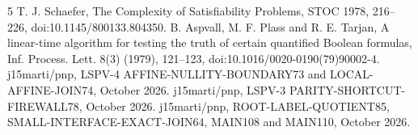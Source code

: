 \documentclass[11pt]{article}
\begin{document}
\begin{thebibliography}{5}
 T. J. Schaefer, The Complexity of Satisfiability
Problems, STOC 1978, 216--226, doi:10.1145/800133.804350.
 B. Aspvall, M. F. Plass and R. E. Tarjan,
A linear-time algorithm for testing the truth of certain
quantified Boolean formulas, Inf. Process. Lett. 8(3) (1979),
121--123, doi:10.1016/0020-0190(79)90002-4.
 j15marti/pnp,
LSPV-4 AFFINE-NULLITY-BOUNDARY73 and
LOCAL-AFFINE-JOIN74, October 2026.
 j15marti/pnp,
LSPV-3 PARITY-SHORTCUT-FIREWALL78, October 2026.
 j15marti/pnp,
ROOT-LABEL-QUOTIENT85, SMALL-INTERFACE-EXACT-JOIN64,
MAIN108 and MAIN110, October 2026.
\end{thebibliography}
\end{document}
